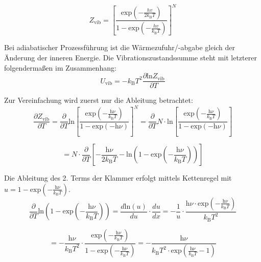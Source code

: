 \documentclass[a4paper,12pt,oneside,onecolum,final,openany]{report}
\begin{document}
\begin{equation}
Z_\mathrm{vib}= \left[\frac{\mathrm{exp}(-\frac{hv}{2k_\mathrm{B}T})}{1-\mathrm{exp}(-\frac{hv}{k_\mathrm{B}T})}\right]^N
\end{equation}

Bei adiabatischer Prozessführung ist die Wärmezufuhr/-abgabe gleich der Änderung der inneren Energie. Die Vibrationszustandssumme steht mit letzterer folgendermaßen im Zusammenhang:\\

\begin{equation} \label{herleiten}
U_\mathrm{vib}= -k_\mathrm{B}T^2 \frac{\partial \mathrm{ln}Z_\mathrm{vib}}{\partial T} 
\end{equation}

Zur Vereinfachung wird zuerst nur die Ableitung betrachtet:\\
\begin{equation}
\frac{\partial Z_\mathrm{vib}}{\partial T}= 
\frac{\partial}{\partial T} \mathrm{ln} \left[ \frac{\mathrm{exp}(-\frac{\mathrm{h}\nu}{k_\mathrm{B}T})}{1-\mathrm{exp}(-\mathrm{h}\nu)} \right]^N 
= \frac{\partial}{\partial T} N\cdot \mathrm{ln} \left[ \frac{\mathrm{exp}(-\frac{\mathrm{h}\nu}{k_\mathrm{B}T})}{1-\mathrm{exp}(-\mathrm{h}\nu)} \right]
\end{equation}


\begin{equation} \label{AbleitungBeginn}
= N \cdot \frac{\partial}{\partial T} \left[-\frac{\mathrm{h} \nu}{2k_\mathrm{B} T}
- \mathrm{ln}\left( 1-\mathrm{exp}\left( -\frac{\mathrm{h}\nu}{k_\mathrm{B}T}\right)\right) \right] 
\end{equation}

Die Ableitung des 2. Terms der Klammer erfolgt mittels Kettenregel mit $u= 1- \mathrm{exp}(-\frac{\mathrm{h}\nu}{k_\mathrm{B}T})$.\\

\begin{equation}
\frac{\partial}{\partial T} \mathrm{ln}(1-\mathrm{exp}(-\frac{\mathrm{h}\nu}{k_\mathrm{B}T}))= \frac{d \mathrm{ln}(u)}{du} \cdot \frac{du}{dx}= -\frac{1}{u} \cdot \frac{\mathrm{h}\nu \cdot \mathrm{exp}(-\frac{\mathrm{h}\nu}{k_\mathrm{B}T})}{k_\mathrm{B}T^2}
\end{equation}

\begin{equation} \label{AblLetzterTerm}
=-\frac{\mathrm{h}\nu}{k_\mathrm{B}T^2} \cdot \frac{\mathrm{exp}(-\frac{\mathrm{h}\nu}{k_\mathrm{B}T})}{1-\mathrm{exp}(-\frac{\mathrm{h}\nu}{k_\mathrm{B}T})}= - \frac{\mathrm{h}\nu}{k_\mathrm{B}T^2  \cdot \mathrm{exp}(\frac{\mathrm{h}\nu}{k_\mathrm{B}T}-1) }
\end{equation}
\end{document}
